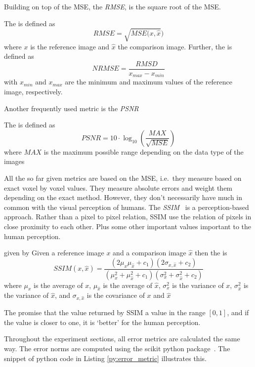 Building on top of the \gls{MSE}, the \textit{\gls{RMSE}}, is the square root of the
\gls{MSE}.
\begin{definition}
	The \textit{} is defined as
	\[ RMSE = \sqrt{MSE(x, \hat{x}}) \]
	where \(x\) is the reference image and \(\hat{x}\) the comparison image. Further, the
	\textit{} is defined as
	\[ NRMSE = \frac{RMSD}{x_{max} - x_{min}} \]
	with \(x_{min}\) and \(x_{max}\) are the minimum and maximum values of the reference image,
	respectively.
\end{definition}
Another frequently used metric is the \textit{\gls{PSNR}}
\begin{definition}
	The \textit{} is defined as
	\[ PSNR = 10 \cdot \log_{10}\left( \frac{MAX}{\sqrt{MSE}} \right) \]
	where \(MAX\) is the maximum possible range depending on the data type of the images
\end{definition}
All the so far given metrics are based on the \gls{MSE}, i.e.\ they measure based on exact voxel by
voxel values. They measure absolute errors and weight them depending on the exact method. However,
they don't necessarily have much in common with the visual perception of humans. The
\textit{\gls{SSIM}}~\cite{wang_image_2004,avanaki_exact_2009} is a perception-based approach.
Rather than a pixel to pixel relation, \gls{SSIM} use the relation of pixels in close proximity to
each other. Plus some other important values important to the human perception.
\begin{definition}
	given by Given a reference image \(x\) and a comparison image \(\hat{x}\) then the
	\textit{} is
	\[ SSIM(x, \hat{x}) = \frac{\left(2 \mu_x \mu_{\hat{x}} + c_1\right) \left( 2
			\sigma_{x, \hat{x}} + c_2 \right)}{\left(\mu_x^2
			+ \mu_{\hat{x}}^2 + c_1 \right) \left( \sigma_x^2 + \sigma_{\hat{x}}^2 + c_2 \right)} \]
	where \(\mu_x\) is the average of \(x\), \(\mu_{\hat{x}}\) is the average of \(\hat{x}\),
	\(\sigma_x^2\) is the variance of \(x\), \(\sigma_{\hat{x}}^2\) is the variance of
	\(\hat{x}\), and \(\sigma_{x, \hat{x}}\) is the covariance of \(x\) and \(\hat{x}\)
\end{definition}
The promise that the value returned by \gls{SSIM} a value in the range \([0, 1]\), and if the value
is closer to one, it is `better' for the human perception.

Throughout the experiment sections, all error metrics are calculated the same way. The error norms
are computed using the scikit python package~\cite{van_der_walt_scikit-image_2014}. The snippet of
python code in Listing \autoref{py:error_metric} illustrates this.

